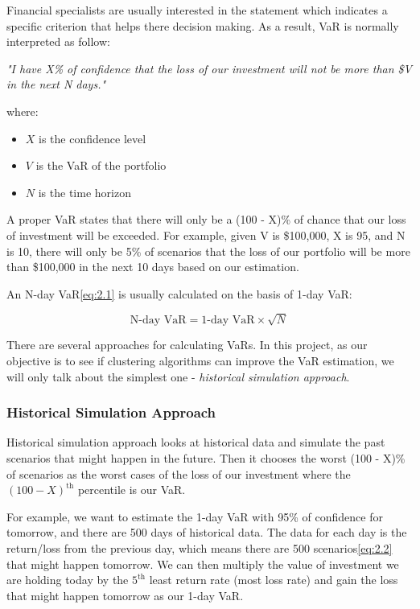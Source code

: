 \documentclass[11pt]{article} %
\theoremstyle{plain}
\theoremstyle{definition}
\begin{document}
Financial specialists are usually interested in the statement which indicates a specific criterion that helps there decision making. As a result, VaR is normally interpreted as follow:

\textsl{"I have X\% of confidence that the loss of our investment will not be more than \$V in the next N days."}

{
  \footnotesize
  where:
  \begin{itemize}[label=-, leftmargin=4em, itemsep=0.1em]
    \item ${X}$ is the confidence level
    \item ${V}$ is the VaR of the portfolio
    \item ${N}$ is the time horizon
  \end{itemize}
}

A proper VaR states that there will only be a (100 - X)\% of chance that our loss of investment will be exceeded. For example, given V is \$100,000, X is 95, and N is 10, there will only be 5\% of scenarios that the loss of our portfolio will be more than \$100,000 in the next 10 days based on our estimation.

An N-day VaR\eqref{eq:2.1} is usually calculated on the basis of 1-day VaR:

\begin{equation}
  \label{eq:2.1}
  \tag{2.1}
  {\text{N-day VaR} = \text{1-day VaR} \times \sqrt{N}}
\end{equation}

There are several approaches for calculating VaRs. In this project, as our objective is to see if clustering algorithms can improve the VaR estimation, we will only talk about the simplest one - \textsl{historical simulation approach}\cite{john/ofaod:2017}.

\subsubsection{Historical Simulation Approach}

Historical simulation approach looks at historical data and simulate the past  scenarios that might happen in the future. Then it chooses the worst (100 - X)\% of scenarios as the worst cases of the loss of our investment where the $(100 - X)^{\mathrm{th}}$ percentile is our VaR.

For example, we want to estimate the 1-day VaR with 95\% of confidence for tomorrow, and there are 500 days of historical data. The data for each day is the return/loss from the previous day, which means there are 500 scenarios\eqref{eq:2.2} that might happen tomorrow. We can then multiply the value of investment we are holding today by the $5^{\mathrm{th}}$ least return rate (most loss rate) and gain the loss that might happen tomorrow as our 1-day VaR\cite{john/ofaod:2017}.
\end{document}
